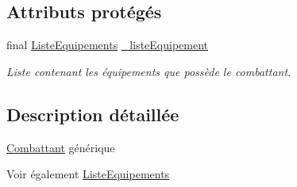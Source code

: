 \subsection*{Attributs protégés}
\begin{DoxyCompactItemize}
\item 
\hypertarget{classindividu_1_1combattant_1_1_combattant_acf5564d980faeef8eee5d28cce73556c}{final \hyperlink{classindividu_1_1combattant_1_1_liste_equipements}{Liste\-Equipements} \hyperlink{classindividu_1_1combattant_1_1_combattant_acf5564d980faeef8eee5d28cce73556c}{\-\_\-liste\-Equipement}}\label{classindividu_1_1combattant_1_1_combattant_acf5564d980faeef8eee5d28cce73556c}

\begin{DoxyCompactList}\small\item\em Liste contenant les équipements que possède le combattant. \end{DoxyCompactList}\end{DoxyCompactItemize}


\subsection{Description détaillée}
\hyperlink{classindividu_1_1combattant_1_1_combattant}{Combattant} générique \begin{DoxySeeAlso}{Voir également}
\hyperlink{classindividu_1_1combattant_1_1_liste_equipements}{Liste\-Equipements} 
\end{DoxySeeAlso}


